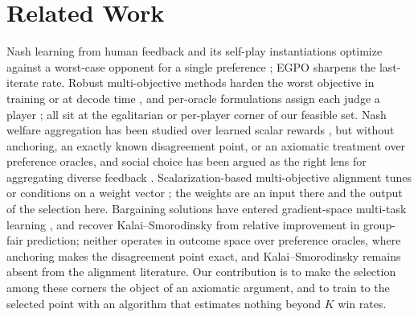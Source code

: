 \documentclass[letterpaper]{article} %
\begin{document}
\section{Related Work}
Nash learning from human feedback and its self-play instantiations optimize against a worst-case opponent for a single preference \citep{munos2024nash,wu2025sppo,zhang2025iterative}; EGPO \citep{zhou2025egpo} sharpens the last-iterate rate. Robust multi-objective methods harden the worst objective in training or at decode time \citep{chakraborty2024maxmin,son2026rmod}, and per-oracle formulations assign each judge a player \citep{wu2026mnpo}; all sit at the egalitarian or per-player corner of our feasible set. Nash welfare aggregation has been studied over learned scalar rewards \citep{zhong2024nashwelfare}, but without anchoring, an exactly known disagreement point, or an axiomatic treatment over preference oracles, and social choice has been argued as the right lens for aggregating diverse feedback \citep{conitzer2024social}. Scalarization-based multi-objective alignment tunes or conditions on a weight vector \citep{zhou2024beyond,rame2023rewarded,wang2024arithmetic,zhong2024panacea}; the weights are an input there and the output of the selection here. Bargaining solutions have entered gradient-space multi-task learning \citep{navon2022nashmtl}, and \citet{han2026fair} recover Kalai--Smorodinsky from relative improvement in group-fair prediction; neither operates in outcome space over preference oracles, where anchoring makes the disagreement point exact, and Kalai--Smorodinsky remains absent from the alignment literature.
Our contribution is to make the selection among these corners the object of an axiomatic argument, and to train to the selected point with an algorithm that estimates nothing beyond $K$ win rates.
\end{document}
